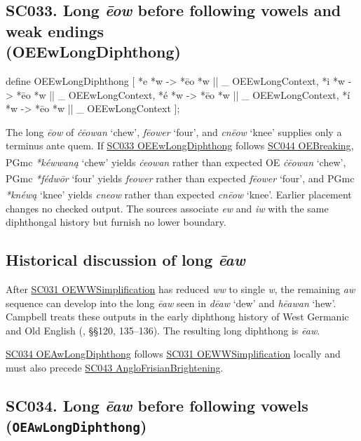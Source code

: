 \documentclass[
  british,
  a4paper,
  openany]{book}
\providecommand{\Pred}[1]{\textsuperscript{\dag}\emph{#1}}
\providecommand{\Recon}[1]{\emph{*#1}}
{\catcode`→=\active \global\def→{\ensuremath{\rightarrow}}}
\providecommand{\texorpdfstring}[2]{#1}
\DeclareRobustCommand{\CAPRRuleHeading}[2]{%
  #1\texorpdfstring{\\(#2)}{ (#2)}%
}
\providecommand{\Pred}[1]{\textsuperscript{\dag}\emph{#1}}
\providecommand{\Recon}[1]{\emph{*#1}}
{\catcode`→=\active \global\def→{\ensuremath{\rightarrow}}}
\begin{document}
\subsection{\texorpdfstring{\CAPRRuleHeading{SC033. Long \emph{ēow} before following vowels and weak endings}{OEEwLongDiphthong}}{}}\label{rule-OEEwLongDiphthong}

\begin{ReaderFacingFoma}
define OEEwLongDiphthong [
    {*e} {*w} -> {*ēo} {*w} || _ OEEwLongContext,
    {*i} {*w} -> {*ēo} {*w} || _ OEEwLongContext,
    {*é} {*w} -> {*ēo} {*w} || _ OEEwLongContext,
    {*í} {*w} -> {*ēo} {*w} || _ OEEwLongContext
];
\end{ReaderFacingFoma}

The long \emph{ēow} of \emph{ċēowan} `chew', \emph{fēower} `four', and
\emph{cnēow} `knee' supplies only a terminus ante quem. If
\hyperref[rule-OEEwLongDiphthong]{SC033 OEEwLongDiphthong} follows
\hyperref[rule-OEBreaking]{SC044 OEBreaking}, PGmc \Recon{kéwwaną}
`chew' yields \Pred{ċeowan} rather than expected OE \emph{ċēowan}
`chew', PGmc \Recon{fédwōr} `four' yields \Pred{feower} rather than
expected \emph{fēower} `four', and PGmc \Recon{knéwą} `knee' yields
\Pred{cneow} rather than expected \emph{cnēow} `knee'. Earlier placement
changes no checked output. The sources associate \emph{ew} and \emph{iw}
with the same diphthongal history but furnish no lower boundary.

\subsection{\texorpdfstring{Historical discussion of long
\emph{ēaw}}{Historical discussion of long }}\label{historical-discussion-of-long-1}

After \hyperref[rule-OEWWSimplification]{SC031 OEWWSimplification} has
reduced \emph{ww} to single \emph{w}, the remaining \emph{aw} sequence
can develop into the long \emph{ēaw} seen in \emph{dēaw} `dew' and
\emph{hēawan} `hew'. Campbell treats these outputs in the early
diphthong history of West Germanic and Old English
(, §§120,
135--136). The resulting long diphthong is \emph{ēaw}.

\hyperref[rule-OEAwLongDiphthong]{SC034 OEAwLongDiphthong} follows
\hyperref[rule-OEWWSimplification]{SC031 OEWWSimplification} locally and
must also precede \hyperref[rule-AngloFrisianBrightening]{SC043
AngloFrisianBrightening}.

\subsection{\texorpdfstring{SC034. Long \emph{ēaw} before following
vowels
(\texttt{OEAwLongDiphthong})}{SC034. Long  before following vowels (OEAwLongDiphthong)}}\label{rule-OEAwLongDiphthong}
\end{document}

